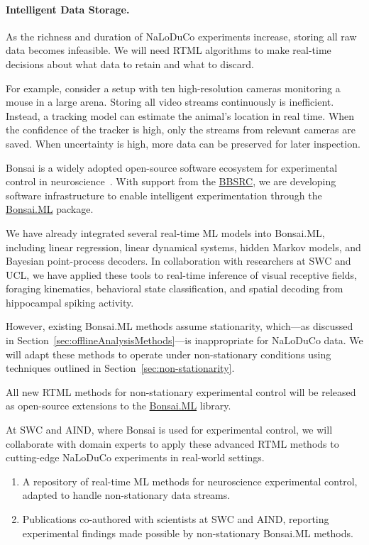 \paragraph{Intelligent Data Storage.}
As the richness and duration of NaLoDuCo experiments increase, storing all raw data becomes infeasible.
%
We will need RTML algorithms to make real-time decisions about what data to retain and what to discard.

%
For example, consider a setup with ten high-resolution cameras monitoring a mouse in a large arena.
%
Storing all video streams continuously is inefficient.
%
Instead, a tracking model can estimate the animal's location in real time.
%
When the confidence of the tracker is high, only the streams from relevant cameras are saved.
%
When uncertainty is high, more data can be preserved for later inspection.


Bonsai is a widely adopted open-source software ecosystem for experimental control in neuroscience~\citep{lopesEtAl15}.
%
With support from the
\href{https://gow.bbsrc.ukri.org/grants/AwardDetails.aspx?FundingReference=BB\%2FW019132\%2F1}{BBSRC},
we are developing software infrastructure to enable intelligent experimentation through the
\href{https://bonsai-rx.org/machinelearning/}{Bonsai.ML} package.

%
We have already integrated several real-time ML models into Bonsai.ML, including linear regression, linear dynamical systems, hidden Markov models, and Bayesian point-process decoders.
%
In collaboration with researchers at SWC and UCL, we have applied these tools to real-time inference of visual receptive fields, foraging kinematics, behavioral state classification, and spatial decoding from hippocampal spiking activity.

%
However, existing Bonsai.ML methods assume stationarity, which—as discussed in Section~\ref{sec:offlineAnalysisMethods}—is inappropriate for NaLoDuCo data.
%
We will adapt these methods to operate under non-stationary conditions using techniques outlined in Section~\ref{sec:non-stationarity}.

%
All new RTML methods for non-stationary experimental control will be released as open-source extensions to the
\href{https://bonsai-rx.org/machinelearning/}{Bonsai.ML} library.

%
At SWC and AIND, where Bonsai is used for experimental control, we will collaborate with domain experts to apply these advanced RTML methods to cutting-edge NaLoDuCo experiments in real-world settings.


\begin{enumerate}
    \item A repository of real-time ML methods for neuroscience experimental control, adapted to handle non-stationary data streams.
    \item Publications co-authored with scientists at SWC and AIND, reporting experimental findings made possible by non-stationary Bonsai.ML methods.
\end{enumerate}

